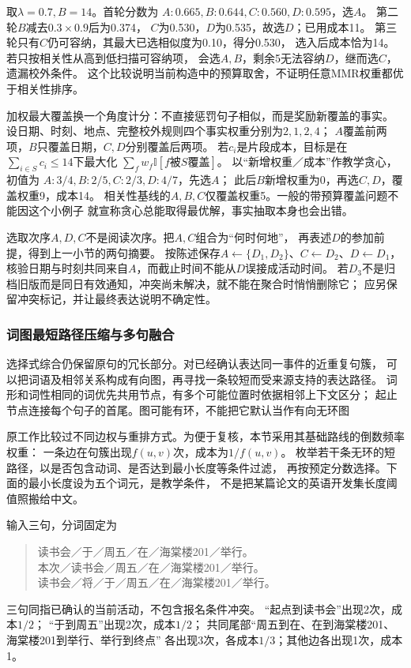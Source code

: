 取$\lambda=0.7,B=14$。首轮分数为
$A:0.665,B:0.644,C:0.560,D:0.595$，选$A$。
第二轮$B$减去$0.3\times0.9$后为0.374，
$C$为0.530，$D$为0.535，故选$D$；已用成本11。
第三轮只有$C$仍可容纳，其最大已选相似度为0.10，得分0.530，
选入后成本恰为14。若只按相关性从高到低扫描可容纳项，
会选$A,B$，剩余5无法容纳$D$，继而选$C$，遗漏校外条件。
这个比较说明当前构造中的预算取舍，不证明任意MMR权重都优于相关性排序。

加权最大覆盖换一个角度计分：不直接惩罚句子相似，而是奖励新覆盖的事实。
设日期、时刻、地点、完整校外规则四个事实权重分别为$2,1,2,4$；
$A$覆盖前两项，$B$只覆盖日期，$C,D$分别覆盖后两项。
若$c_i$是片段成本，目标是在$\sum_{i\in S}c_i\leq14$下最大化
$\sum_f w_f\mathbb{I}[f\text{被}S\text{覆盖}]$。
以“新增权重／成本”作教学贪心，初值为
$A:3/4,B:2/5,C:2/3,D:4/7$，先选$A$；
此后$B$新增权重为0，再选$C,D$，覆盖权重9，成本14。
相关性基线的$A,B,C$仅覆盖权重5。一般的带预算覆盖问题不能因这个小例子
就宣称贪心总能取得最优解，事实抽取本身也会出错。

选取次序$A,D,C$不是阅读次序。把$A,C$组合为“何时何地”，
再表述$D$的参加前提，得到上一小节的两句摘要。
按陈述保存$A\leftarrow\{D_1,D_2\}$、$C\leftarrow D_2$、$D\leftarrow D_1$，
核验日期与时刻共同来自$A$，而截止时间不能从$D$误接成活动时间。
若$D_3$不是归档旧版而是同日有效通知，冲突尚未解决，就不能在聚合时悄悄删除它；
应另保留冲突标记，并让最终表达说明不确定性。

\subsubsection{词图最短路径压缩与多句融合}
\label{sec:nlp-generation-word-graph}

选择式综合仍保留原句的冗长部分。对已经确认表达同一事件的近重复句簇，
可以把词语及相邻关系构成有向图，再寻找一条较短而受来源支持的表达路径。
词形和词性相同的词优先共用节点，有多个可能位置时依据相邻上下文区分；
起止节点连接每个句子的首尾。图可能有环，不能把它默认当作有向无环图

原工作比较过不同边权与重排方式。为便于复核，本节采用其基础路线的倒数频率权重：
一条边在句簇出现$f(u,v)$次，成本为$1/f(u,v)$。
枚举若干条无环的短路径，以是否包含动词、是否达到最小长度等条件过滤，
再按预定分数选择。下面的最小长度设为五个词元，是教学条件，
不是把某篇论文的英语开发集长度阈值照搬给中文。

输入三句，分词固定为
\begin{quote}
读书会／于／周五／在／海棠楼201／举行。\\
本次／读书会／周五／在／海棠楼201／举行。\\
读书会／将／于／周五／在／海棠楼201／举行。
\end{quote}
三句同指已确认的当前活动，不包含报名条件冲突。
“起点到读书会”出现2次，成本$1/2$；
“于到周五”出现2次，成本$1/2$；
共同尾部“周五到在、在到海棠楼201、海棠楼201到举行、举行到终点”
各出现3次，各成本$1/3$；其他边各出现1次，成本1。

